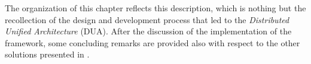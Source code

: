 The organization of this chapter reflects this description, which is nothing but the recollection of the design and development process that led to the \emph{Distributed Unified Architecture} (DUA). After the discussion of the implementation of the framework, some concluding remarks are provided also with respect to the other solutions presented in .





